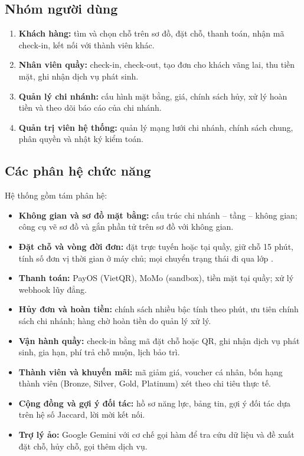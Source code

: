 \subsection{Nhóm người dùng}
\begin{enumerate}
    \item \textbf{Khách hàng:} tìm và chọn chỗ trên sơ đồ, đặt chỗ, thanh toán, nhận mã check-in, kết nối với thành viên khác.
    \item \textbf{Nhân viên quầy:} check-in, check-out, tạo đơn cho khách vãng lai, thu tiền mặt, ghi nhận dịch vụ phát sinh.
    \item \textbf{Quản lý chi nhánh:} cấu hình mặt bằng, giá, chính sách hủy, xử lý hoàn tiền và theo dõi báo cáo của chi nhánh.
    \item \textbf{Quản trị viên hệ thống:} quản lý mạng lưới chi nhánh, chính sách chung, phân quyền và nhật ký kiểm toán.
\end{enumerate}

\subsection{Các phân hệ chức năng}
Hệ thống gồm tám phân hệ:
\begin{itemize}
    \item \textbf{Không gian và sơ đồ mặt bằng:} cấu trúc chi nhánh -- tầng -- không gian; công cụ vẽ sơ đồ và gắn phần tử trên sơ đồ với không gian.
    \item \textbf{Đặt chỗ và vòng đời đơn:} đặt trực tuyến hoặc tại quầy, giữ chỗ 15 phút, tính số đơn vị thời gian ở máy chủ; mọi chuyển trạng thái đi qua lớp .
    \item \textbf{Thanh toán:} PayOS (VietQR), MoMo (sandbox), tiền mặt tại quầy; xử lý webhook lũy đẳng.
    \item \textbf{Hủy đơn và hoàn tiền:} chính sách nhiều bậc tính theo phút, ưu tiên chính sách chi nhánh; hàng chờ hoàn tiền do quản lý xử lý.
    \item \textbf{Vận hành quầy:} check-in bằng mã đặt chỗ hoặc QR, ghi nhận dịch vụ phát sinh, gia hạn, phí trả chỗ muộn, lịch bảo trì.
    \item \textbf{Thành viên và khuyến mãi:} mã giảm giá, voucher cá nhân, bốn hạng thành viên (Bronze, Silver, Gold, Platinum) xét theo chi tiêu thực tế.
    \item \textbf{Cộng đồng và gợi ý đối tác:} hồ sơ năng lực, bảng tin, gợi ý đối tác dựa trên hệ số Jaccard, lời mời kết nối.
    \item \textbf{Trợ lý ảo:} Google Gemini với cơ chế gọi hàm để tra cứu dữ liệu và đề xuất đặt chỗ, hủy chỗ, gọi thêm dịch vụ.
\end{itemize}

